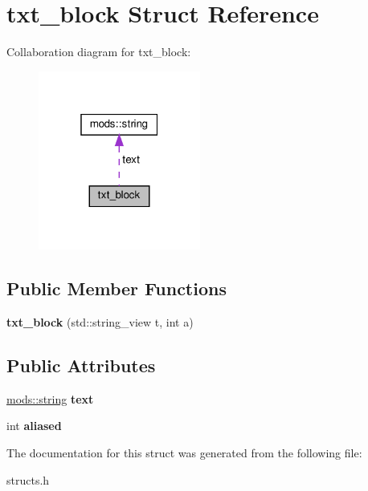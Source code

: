 \hypertarget{structtxt__block}{}\section{txt\+\_\+block Struct Reference}
\label{structtxt__block}


Collaboration diagram for txt\+\_\+block\+:\nopagebreak
\begin{figure}[H]
\begin{center}
\leavevmode
\includegraphics[width=151pt]{structtxt__block__coll__graph}
\end{center}
\end{figure}
\subsection*{Public Member Functions}
\begin{DoxyCompactItemize}
\item 
\mbox{\label{structtxt__block_a1ebe94e0fd7c590ebc1f4651190bfcd2}} 
{\bfseries txt\+\_\+block} (std\+::string\+\_\+view t, int a)
\end{DoxyCompactItemize}
\subsection*{Public Attributes}
\begin{DoxyCompactItemize}
\item 
\mbox{\label{structtxt__block_ab73978f0e32d4ebaae4415aa4231059d}} 
\hyperlink{structmods_1_1string}{mods\+::string} {\bfseries text}
\item 
\mbox{\label{structtxt__block_a30621ea89d0dffa223c021419015b38a}} 
int {\bfseries aliased}
\end{DoxyCompactItemize}


The documentation for this struct was generated from the following file\+:\begin{DoxyCompactItemize}
\item 
structs.\+h\end{DoxyCompactItemize}
